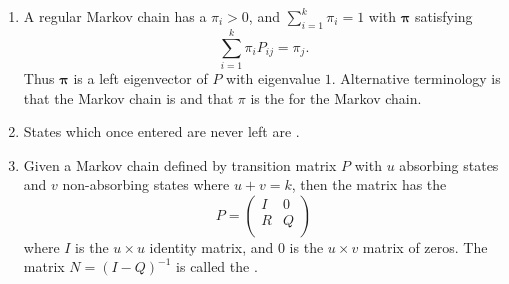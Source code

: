 \documentclass[12pt]{article}
\begin{document}
\begin{enumerate}
    \item
        A regular Markov chain has a  \(
        \pi_i > 0 \), and \( \sum_{i=1}^k \pi_i = 1 \) with \( \mathbf{\pi}
        \) satisfying
        \[
            \sum\limits_{i=1}^k \pi_i P_{ij} = \pi_{j}.
        \] Thus \( \mathbf{\pi} \) is a left eigenvector of \( P \) with
        eigenvalue \( 1 \).  Alternative terminology is that the Markov
        chain is 
        and that \( \pi \) is the  for the
        Markov chain. %
    \item
        States which once entered are never left are .
    \item
        Given a Markov chain defined by transition matrix \( P \) with \(
        u \) absorbing states and \( v \) non-absorbing states where \(
        u + v = k \), then the matrix has the 
        \[
            P=
            \begin{pmatrix}
                I & 0 \\
                R & Q \\
            \end{pmatrix}
        \] where \( I \) is the \( u\times u \) identity matrix, and \(
        0 \) is the \( u\times v \) matrix of zeros.  The matrix \( N=(I-Q)^
        {-1} \) is called the .
\end{enumerate}
\end{document}
